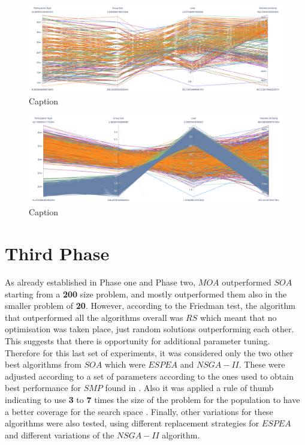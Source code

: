 \begin{figure}
    \centering
    \includegraphics[width=\textwidth]{images/para_front_mixed_20_moa.png}
    \caption{Caption}
    \label{fig:my_label}
\end{figure}

\begin{figure}
    \centering
    \includegraphics[width=\textwidth]{images/para_front_mized_200_moa.png}
    \caption{Caption}
    \label{fig:my_label}
\end{figure}



\section{Third Phase}

As already established in Phase one and Phase two, $MOA$ outperformed $SOA$ starting from a \textbf{200} size problem, and mostly outperformed them also in the smaller problem of \textbf{20}. However, according to the Friedman test, the algorithm that outperformed all the algorithms overall was $RS$ which meant that no optimisation was taken place, just random solutions outperforming each other. \\

This suggests that there is opportunity for additional parameter tuning. Therefore for this last set of experiments, it was considered only the two other best algorithms from $SOA$ which were $ESPEA$ and $NSGA-II$. These were adjusted according to a set of parameters according to the ones used to obtain best performance for $SMP$ found in \cite{}. Also it was applied a rule of thumb indicating to use \textbf{3} to \textbf{7} times the size of the problem for the population to have a better coverage for the search space \cite{}. Finally, other variations for these algorithms were also tested, using different replacement strategies for $ESPEA$ and different variations of the $NSGA-II$ algorithm. \\

